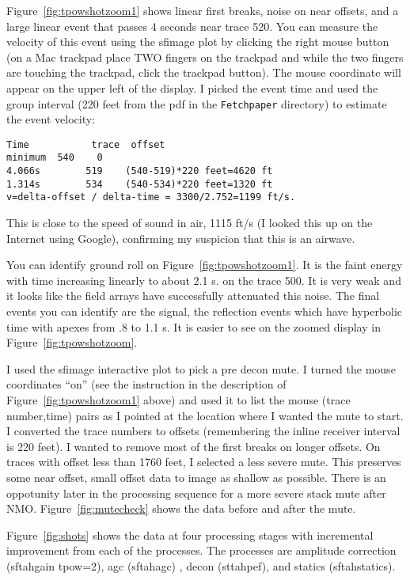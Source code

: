 Figure~\ref{fig:tpowshotzoom1} shows linear first breaks, noise on near offsets, and a large linear event that passes 4 seconds near trace 520.  You can measure the velocity of this event using the sfimage plot by clicking the right mouse button (on a Mac trackpad place TWO fingers on the trackpad and while the two fingers are touching the trackpad, click the trackpad button).  The mouse coordinate will appear on the upper left of the display.  I picked the event time and used the group interval (220 feet from the pdf in the \texttt{Fetchpaper} directory) to estimate the event velocity:
\begin{verbatim}  
Time           trace  offset
minimum  540    0
4.066s        519    (540-519)*220 feet=4620 ft
1.314s        534    (540-534)*220 feet=1320 ft
v=delta-offset / delta-time = 3300/2.752=1199 ft/s.
\end{verbatim}  

This is close to the speed of sound in air, 1115 ft/s (I looked this up on the Internet using Google), confirming my suspicion that this is an airwave.   

You can identify ground roll on Figure~\ref{fig:tpowshotzoom1}.  It is the faint energy with time increasing linearly to about 2.1 s. on the trace 500.  It is very weak and it looks like the field arrays have successfully attenuated this noise.  The final events you can identify are the signal, the reflection events which have hyperbolic time with apexes from .8 to 1.1 s.  It is easier to see on the zoomed display in Figure~\ref{fig:tpowshotzoom}.

I used the sfimage interactive plot to pick a pre decon mute.  I turned the mouse coordinates “on” (see the instruction in the description of Figure~\ref{fig:tpowshotzoom1} above) and used it to list the mouse (trace number,time) pairs as I pointed at the location where I wanted the mute to start.  I converted the trace numbers to offsets (remembering the inline receiver interval is 220 feet).  I wanted to remove most of the first breaks on longer offsets.  On traces with offset less than 1760 feet, I selected a less severe mute.  This preserves some near offset, small offset data to image as shallow as possible.  There is an oppotunity later in the processing sequence for a more severe stack mute after NMO.  Figure~\ref{fig:mutecheck} shows the data before and after the mute.

Figure~\ref{fig:shots} shows the data at four processing stages with incremental improvement from each of the processes.  The processes are amplitude correction (sftahgain tpow=2), agc (sftahagc) , decon (sttahpef), and statics (sftahstatics).

